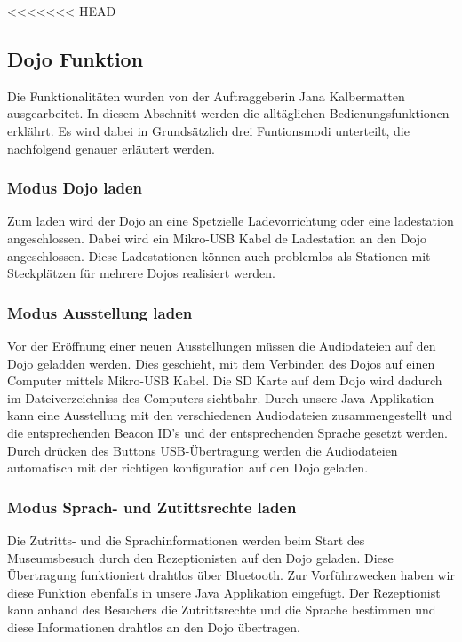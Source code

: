 <<<<<<< HEAD
\subsection{Dojo Funktion}
Die Funktionalitäten wurden von der Auftraggeberin Jana Kalbermatten ausgearbeitet. In diesem Abschnitt werden die alltäglichen Bedienungsfunktionen erklährt. Es wird dabei in Grundsätzlich drei Funtionsmodi unterteilt, die nachfolgend genauer erläutert werden.
\subsubsection{Modus Dojo laden}
Zum laden wird der Dojo an eine Spetzielle Ladevorrichtung oder eine ladestation angeschlossen. Dabei wird ein Mikro-USB Kabel de Ladestation an den Dojo angeschlossen. Diese Ladestationen können auch problemlos als Stationen mit Steckplätzen für mehrere Dojos realisiert werden.
\subsubsection{Modus Ausstellung laden}
Vor der Eröffnung einer neuen Ausstellungen müssen die Audiodateien auf den Dojo geladden werden. Dies geschieht, mit dem Verbinden des Dojos auf einen Computer mittels Mikro-USB Kabel. Die SD Karte auf dem Dojo wird dadurch im Dateiverzeichniss des Computers sichtbahr. Durch unsere Java Applikation kann eine Ausstellung mit den verschiedenen Audiodateien zusammengestellt und die entsprechenden Beacon ID's und der entsprechenden Sprache gesetzt werden. Durch drücken des Buttons USB-Übertragung werden die Audiodateien automatisch mit der richtigen konfiguration auf den Dojo geladen.

\subsubsection{Modus Sprach- und Zutittsrechte laden}
Die Zutritts- und die Sprachinformationen werden beim Start des Museumsbesuch durch den Rezeptionisten auf den Dojo geladen. Diese Übertragung funktioniert drahtlos über Bluetooth. Zur Vorführzwecken haben wir diese Funktion ebenfalls in unsere Java Applikation eingefügt. Der Rezeptionist kann anhand des Besuchers die Zutrittsrechte und die Sprache bestimmen und diese Informationen drahtlos an den Dojo übertragen.

